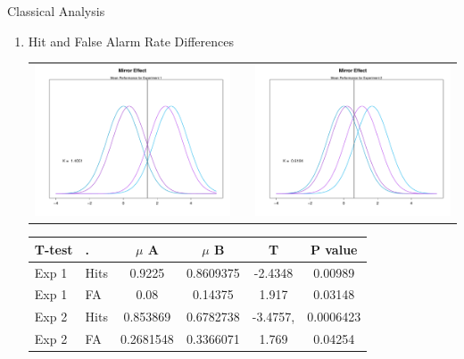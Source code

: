 \documentclass[final]{beamer}
\newlength{\onecolwid}
\newlength{\twocolwid}
\begin{document}
\begin{frame}[t]
\begin{columns}[t]
\begin{column}{\twocolwid}
\begin{columns}[t,totalwidth=\twocolwid]
\begin{column}{\onecolwid}
\begin{alertblock}{Classical Analysis}
\begin{enumerate}
\item Hit and False Alarm Rate Differences
\begin{center}
\begin{tabular}{ccc}
\includegraphics[width=0.4\linewidth]{Figures/MirrorRate_1.pdf} & \hfill & \includegraphics[width=0.4\linewidth]{Figures/MirrorRate_2.pdf}
\end{tabular}
\end{center}
\begin{table}
\vspace{3ex}
\begin{tabular}{l l | c c c c}
\toprule
\textbf{T-test} & \textbf{.} & \textbf{$\mu$ A} & \textbf{$\mu$ B} & \textbf{T} & \textbf{P value}\\
\midrule
Exp 1 & Hits & 0.9225 & 0.8609375 & -2.4348 & 0.00989 \\
Exp 1 & FA & 0.08 & 0.14375 & 1.917 & 0.03148 \\
Exp 2 & Hits & 0.853869 & 0.6782738 & -3.4757, & 0.0006423 \\
Exp 2 & FA & 0.2681548 & 0.3366071 & 1.769 & 0.04254 \\
\bottomrule
\end{tabular}
\end{table}

$\quad$


\end{enumerate}
\end{alertblock}
\end{column}
\end{columns}
\end{column}
\end{columns}
\end{frame}
\end{document}
